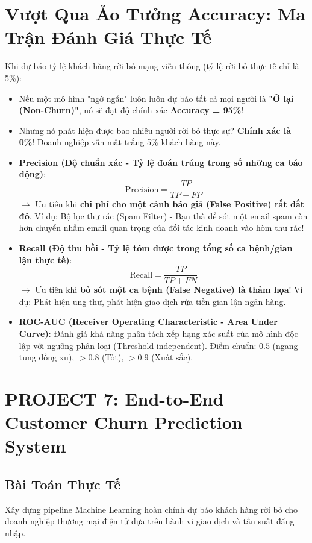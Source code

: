 \section{Vượt Qua Ảo Tưởng Accuracy: Ma Trận Đánh Giá Thực Tế}

Khi dự báo tỷ lệ khách hàng rời bỏ mạng viễn thông (tỷ lệ rời bỏ thực tế chỉ là 5\%):
\begin{itemize}
    \item Nếu một mô hình "ngớ ngẩn" luôn luôn dự báo tất cả mọi người là \textbf{"Ở lại (Non-Churn)"}, nó sẽ đạt độ chính xác \textbf{Accuracy = 95\%}!
    \item Nhưng nó phát hiện được bao nhiêu người rời bỏ thực sự? \textbf{Chính xác là 0\%}! Doanh nghiệp vẫn mất trắng 5\% khách hàng này.
\end{itemize}

\begin{thuchanhbox}
\begin{itemize}
    \item \textbf{Precision (Độ chuẩn xác - Tỷ lệ đoán trúng trong số những ca báo động)}:
    \[
    \text{Precision} = \frac{TP}{TP + FP}
    \]
    $\rightarrow$ Ưu tiên khi \textbf{chi phí cho một cảnh báo giả (False Positive) rất đắt đỏ}. Ví dụ: Bộ lọc thư rác (Spam Filter) - Bạn thà để sót một email spam còn hơn chuyển nhầm email quan trọng của đối tác kinh doanh vào hòm thư rác!
    \item \textbf{Recall (Độ thu hồi - Tỷ lệ tóm được trong tổng số ca bệnh/gian lận thực tế)}:
    \[
    \text{Recall} = \frac{TP}{TP + FN}
    \]
    $\rightarrow$ Ưu tiên khi \textbf{bỏ sót một ca bệnh (False Negative) là thảm họa}! Ví dụ: Phát hiện ung thư, phát hiện giao dịch rửa tiền gian lận ngân hàng.
    \item \textbf{ROC-AUC (Receiver Operating Characteristic - Area Under Curve)}: Đánh giá khả năng phân tách xếp hạng xác suất của mô hình độc lập với ngưỡng phân loại (Threshold-independent). Điểm chuẩn: $0.5$ (ngang tung đồng xu), $>0.8$ (Tốt), $>0.9$ (Xuất sắc).
\end{itemize}
\end{thuchanhbox}

\section{PROJECT 7: End-to-End Customer Churn Prediction System}

\subsection{Bài Toán Thực Tế}
Xây dựng pipeline Machine Learning hoàn chỉnh dự báo khách hàng rời bỏ cho doanh nghiệp thương mại điện tử dựa trên hành vi giao dịch và tần suất đăng nhập.

